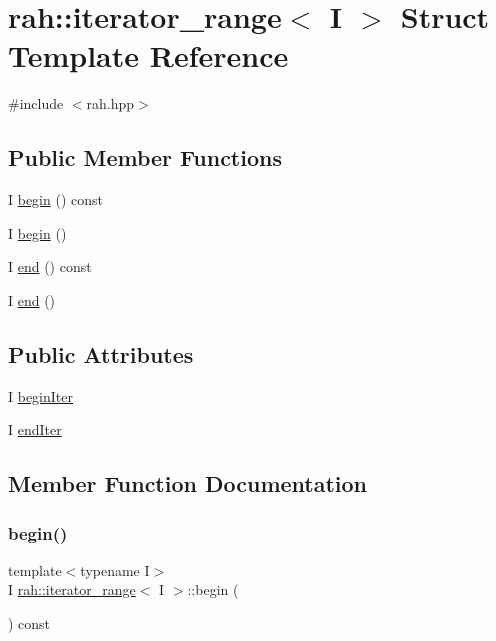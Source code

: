 \hypertarget{structrah_1_1iterator__range}{}\section{rah\+::iterator\+\_\+range$<$ I $>$ Struct Template Reference}
\label{structrah_1_1iterator__range}


{\ttfamily \#include $<$rah.\+hpp$>$}

\subsection*{Public Member Functions}
\begin{DoxyCompactItemize}
\item 
I \mbox{\hyperlink{structrah_1_1iterator__range_a8e9c129ae0443c763ec87748add1b8fa}{begin}} () const
\item 
I \mbox{\hyperlink{structrah_1_1iterator__range_a1281848b740db43274f5be412c1a83f4}{begin}} ()
\item 
I \mbox{\hyperlink{structrah_1_1iterator__range_a8945eefba8353b52d0eaa97491d00ab3}{end}} () const
\item 
I \mbox{\hyperlink{structrah_1_1iterator__range_af0aabf4f87c49cc40e9877cbb296a926}{end}} ()
\end{DoxyCompactItemize}
\subsection*{Public Attributes}
\begin{DoxyCompactItemize}
\item 
I \mbox{\hyperlink{structrah_1_1iterator__range_a97263772394bcdb263d128d3157bffb1}{begin\+Iter}}
\item 
I \mbox{\hyperlink{structrah_1_1iterator__range_a8008a95fc7f6b6042510261e6b06de1f}{end\+Iter}}
\end{DoxyCompactItemize}


\subsection{Member Function Documentation}
\mbox{\label{structrah_1_1iterator__range_a8e9c129ae0443c763ec87748add1b8fa}} 
\subsubsection{\texorpdfstring{begin()}{begin()}\hspace{0.1cm}{\footnotesize\ttfamily [1/2]}}
{\footnotesize\ttfamily template$<$typename I$>$ \\
I \mbox{\hyperlink{structrah_1_1iterator__range}{rah\+::iterator\+\_\+range}}$<$ I $>$\+::begin (\begin{DoxyParamCaption}{ }\end{DoxyParamCaption}) const\hspace{0.3cm}{\ttfamily [inline]}}

